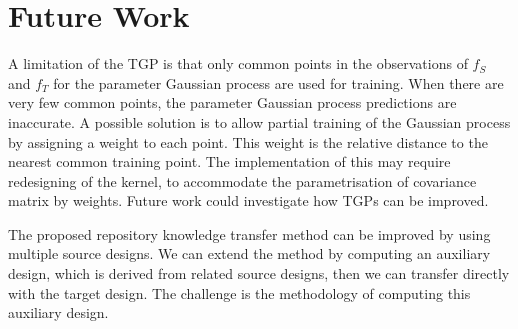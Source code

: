 \documentclass[10pt,a4paper]{article}
\begin{document}
\section{Future Work}

A limitation of the TGP is that only common points in the observations of $f_S$ and $f_T$ for the parameter Gaussian process are used for training. When there are very few common points, the parameter Gaussian process predictions are inaccurate. A possible solution is to allow partial training of the Gaussian process by assigning a weight to each point. This weight is the relative distance to the nearest common training point. The implementation of this may require redesigning of the kernel, to accommodate the parametrisation of covariance matrix by weights. Future work could investigate how TGPs can be improved.

The proposed repository knowledge transfer method can be improved by using multiple source designs. We can extend the method by computing an auxiliary design, which is derived from related source designs, then we can transfer directly with the target design. The challenge is the methodology of computing this auxiliary design.



\end{document}
